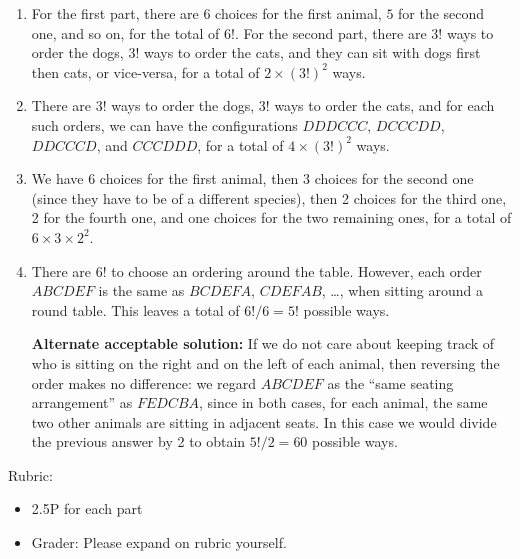 \documentclass{article}
\theoremstyle{definition}
\begin{document}
\begin{solution}
\begin{enumerate}
	\item For the first part, there are $6$ choices for the first animal, $5$ for the second one, and so on, for the total of $6!$. For the second part, there are $3!$ ways to order the dogs, $3!$ ways to order the cats, and they can sit with dogs first then cats, or vice-versa, for a total of $2 \times (3!)^2$ ways.
	
	\item There are $3!$ ways to order the dogs, $3!$ ways to order the cats, and for each such orders, we can have the configurations $DDDCCC$, $DCCCDD$, $DDCCCD$, and $CCCDDD$, for a total of $4 \times (3!)^2$ ways.
	
	\item We have 6 choices for the first animal, then 3 choices for the second one (since they have to be of a different species), then 2 choices for the third one, 2 for the fourth one, and one choices for the two remaining ones, for a total of $6 \times 3 \times 2^2$.
	
	\item There are $6!$ to choose an ordering around the table. However, each order $ABCDEF$ is the same as $BCDEFA$, $CDEFAB$, \dots, when sitting around a round table. This leaves a total of $6! / 6 = 5!$ possible ways.
	
    \textbf{Alternate acceptable solution:} If we do not care about keeping track of who is sitting on the right and on the left of each animal, then reversing the order makes no difference: we regard $ABCDEF$ as the ``same seating arrangement'' as $FEDCBA$, since in both cases, for each animal, the same two other animals are sitting in adjacent seats. In this case we would divide the previous answer by 2 to obtain $5! / 2 = 60$ possible ways.
	
\end{enumerate}
{\color{red} Rubric:
\begin{itemize}
\item 2.5P for each part
\item Grader: Please expand on rubric yourself.
\end{itemize}}
\end{solution}
\end{document}
